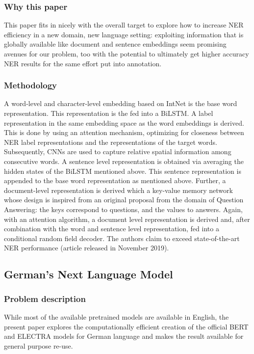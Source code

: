 \documentclass[11pt]{article}
\begin{document}
\subsubsection{Why this paper}

This paper fits in nicely with the overall target to explore how to increase NER efficiency in a new domain, new language setting: exploiting information that is globally available like document and sentence embeddings seem promising avenues for our problem, too with the potential to ultimately get higher accuracy NER results for the same effort put into annotation. 

\subsubsection{Methodology}

A word-level and character-level embedding based on IntNet is the base word representation. This representation is the fed into a BiLSTM. A label representation in the same embedding space as the word embeddings is derived. This is done by using an attention mechanism, optimizing for closeness between NER label representations and the representations of the target words. Subsequently, CNNs are used to capture relative spatial information among consecutive words. A sentence level representation is obtained via averaging the hidden states of the BiLSTM mentioned above. This sentence representation is appended to the base word representation as mentioned above. Further, a document-level representation is derived which a key-value memory network whose design is inspired from an original proposal from the domain of Question Answering: the keys correspond to questions, and the values to answers. Again, with an attention algorithm, a document level representation is derived and, after combination with the word and sentence level representation, fed into a conditional random field decoder. The authors claim to exceed state-of-the-art NER performance (article released in November 2019). 


\subsection{German's Next Language Model
\citet{Chan-2020} }
\subsubsection{Problem description}
While most of the available pretrained models are available in English, the present paper explores the computationally efficient creation of the official BERT and ELECTRA models for German language and makes the result available for general purpose re-use. 
\end{document}
